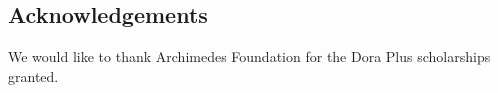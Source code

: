 \documentclass[a1,portrait]{a0poster}
\begin{document}
\begin{multicols}{2}
\section*{Acknowledgements}


We would like to thank Archimedes Foundation for the Dora Plus scholarships granted.





\end{multicols}
\end{document}
